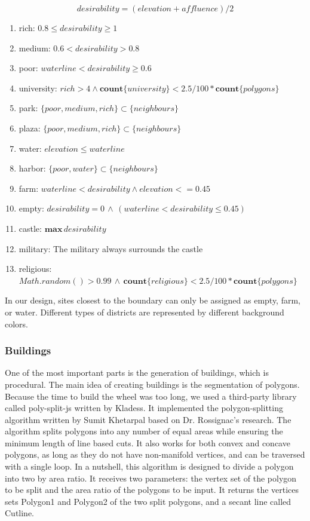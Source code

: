 \[ desirability = (elevation + affluence) / 2 \]

\begin{enumerate}
  \item rich: $0.8 \leq desirability \geq 1$
  \item medium: $0.6 < desirability > 0.8$
  \item poor: $waterline < desirability \geq 0.6$
  \item university: $rich > 4 \wedge \mathbf{count} \{university\} < 2.5 / 100 * \mathbf{count} \{polygons\}$
  \item park: $\{poor, medium, rich\} \subset \{neighbours\}$
  \item plaza: $\{poor, medium, rich\} \subset \{neighbours\}$
  \item water: $elevation \leq waterline$
  \item harbor: $\{poor, water\} \subset \{neighbours\}$
  \item farm: $waterline < desirability \wedge elevation <= 0.45$
  \item empty: $desirability = 0 \, \wedge \, (waterline < desirability \leq 0.45)$
  \item castle: $\mathbf{max}\,desirability$
  \item military: The military always surrounds the castle
  \item religious: $Math.random() > 0.99 \, \wedge \, \mathbf{count} \{religious\} < 2.5 / 100 * \mathbf{count} \{polygons\}$
\end{enumerate}

In our design, sites closest to the boundary can only be assigned as empty, farm, or water. Different types of districts are represented by different background colors.

\subsubsection{Buildings}
One of the most important parts is the generation of buildings, which is procedural.
The main idea of creating buildings is the segmentation of polygons. Because the time to build the wheel was too long, we used a third-party library called poly-split-js written by Kladess. It implemented the polygon-splitting algorithm written by Sumit Khetarpal based on Dr. Rossignac's research. The algorithm splits polygons into any number of equal areas while ensuring the minimum length of line based cuts. It also works for both convex and concave polygons, as long as they do not have non-manifold vertices, and can be traversed with a single loop. In a nutshell, this algorithm is designed to divide a polygon into two by area ratio. It receives two parameters: the vertex set of the polygon to be split and the area ratio of the polygons to be input. It returns the vertices sets Polygon1 and Polygon2 of the two split polygons, and a secant line called Cutline.

